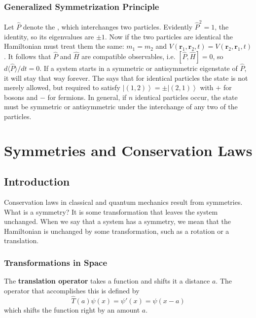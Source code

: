 \documentclass[12pt, a4paper, oneside, openright, titlepage]{book}
\newcommand{\ket}[1]{\left\vert#1\right\rangle}
\begin{document}
\subsection{Generalized Symmetrization Principle}

Let $\hat{P}$ denote the , which interchanges two particles. Evidently $\hat{P}^2 = 1$, the identity, so its eigenvalues are $\pm 1$. Now if the two particles are identical the Hamiltonian must treat them the same: $m_1 = m_2$ and $V(\mathbf{r}_1,\mathbf{r}_2,t) = V(\mathbf{r}_2,\mathbf{r}_1,t)$. It follows that $\hat{P}$ and $\hat{H}$ are compatible observables, i.e. $[\hat{P},\hat{H}] = 0$, so $d\langle \hat{P}\rangle/dt = 0$. If a system starts in a symmetric or antisymmetric eigenstate of $\hat{P}$, it will stay that way forever. The  says that for identical particles the state is not merely allowed, but required to satisfy $\ket{(1,2)} = \pm\ket{(2,1)}$ with $+$ for bosons and $-$ for fermions. In general, if $n$ identical particles occur, the state must be symmetric or antisymmetric under the interchange of any two of the particles. 




\chapter{Symmetries and Conservation Laws}

\section{Introduction}

Conservation laws in classical and quantum mechanics result from symmetries. What is a symmetry? It is some transformation that leaves the system unchanged. When we say that a system has a symmetry, we mean that the Hamiltonian is unchanged by some transformation, such as a rotation or a translation.

\subsection{Transformations in Space}

The \textbf{translation operator} takes a function and shifts it a distance $a$. The operator that accomplishes this is defined by \begin{equation*}
    \hat{T}(a)\psi(x) = \psi'(x) = \psi(x-a)
\end{equation*}
which shifts the function right by an amount $a$.
\end{document}
